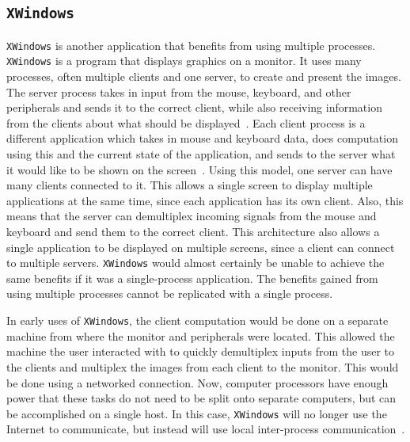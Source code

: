 \subsection{\texttt{XWindows}}
\label{sec:xwindows}
\texttt{XWindows} is another application that benefits from using multiple processes.  \texttt{XWindows} is a program that displays graphics on a monitor.  It uses many processes, often multiple clients and one server, to create and present the images.  The server process takes in input from the mouse, keyboard, and other peripherals and sends it to the correct client, while also receiving information from the clients about what should be displayed~\cite{Scheifler:1986:XWS:22949.24053}.  Each client process is a different application which takes in mouse and keyboard data, does computation using this and the current state of the application, and sends to the server what it would like to be shown on the screen~\cite{Scheifler:1986:XWS:22949.24053}.  Using this model, one server can have many clients connected to it.  This allows a single screen to display multiple applications at the same time, since each application has its own client.  Also, this means that the server can demultiplex incoming signals from the mouse and keyboard and send them to the correct client.  This architecture also allows a single application to be displayed on multiple screens, since a client can connect to multiple servers.  \texttt{XWindows} would almost certainly be unable to achieve the same benefits if it was a single-process application.  The benefits gained from using multiple processes cannot be replicated with a single process.

In early uses of \texttt{XWindows}, the client computation would be done on a separate machine from where the monitor and peripherals were located.  This allowed the machine the user interacted with to quickly demultiplex inputs from the user to the clients and multiplex the images from each client to the monitor.  This would be done using a networked connection.  Now, computer processors have enough power that these tasks do not need to be split onto separate computers, but can be accomplished on a single host.  In this case, \texttt{XWindows} will no longer use the Internet to communicate, but instead will use local inter-process communication~\cite[p 373]{Stevens:1997:UNP:522800}.


